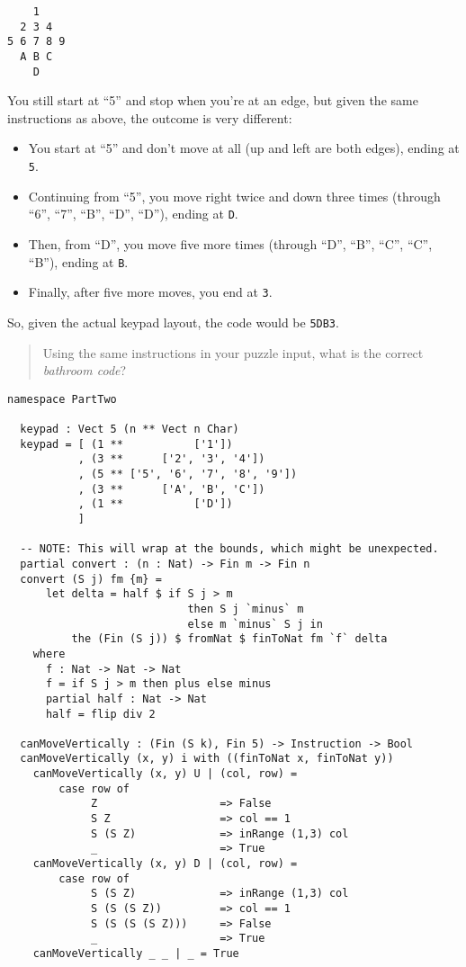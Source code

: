 \documentclass[b5paper,twoside]{amsbook}
\providecommand{\tightlist}{%
  \setlength{\itemsep}{0pt}\setlength{\parskip}{0pt}}
\begin{document}
\begin{verbatim}
    1
  2 3 4
5 6 7 8 9
  A B C
    D
\end{verbatim}

You still start at ``5'' and stop when you're at an edge, but given the
same instructions as above, the outcome is very different:

\begin{itemize}
\tightlist
\item
  You start at ``5'' and don't move at all (up and left are both edges),
  ending at \texttt{5}.
\item
  Continuing from ``5'', you move right twice and down three times
  (through ``6'', ``7'', ``B'', ``D'', ``D''), ending at
  \texttt{D}.
\item
  Then, from ``D'', you move five more times (through ``D'', ``B'',
  ``C'', ``C'', ``B''), ending at \texttt{B}.
\item
  Finally, after five more moves, you end at \texttt{3}.
\end{itemize}

\newpage

So, given the actual keypad layout, the code would be
\texttt{5DB3}.

\begin{quote}
  Using the same instructions in your puzzle input, what is the correct
  \textit{bathroom code}?
\end{quote}

\begin{verbatim}
namespace PartTwo

  keypad : Vect 5 (n ** Vect n Char)
  keypad = [ (1 **           ['1'])
           , (3 **      ['2', '3', '4'])
           , (5 ** ['5', '6', '7', '8', '9'])
           , (3 **      ['A', 'B', 'C'])
           , (1 **           ['D'])
           ]

  -- NOTE: This will wrap at the bounds, which might be unexpected.
  partial convert : (n : Nat) -> Fin m -> Fin n
  convert (S j) fm {m} =
      let delta = half $ if S j > m
                            then S j `minus` m
                            else m `minus` S j in
          the (Fin (S j)) $ fromNat $ finToNat fm `f` delta
    where
      f : Nat -> Nat -> Nat
      f = if S j > m then plus else minus
      partial half : Nat -> Nat
      half = flip div 2

  canMoveVertically : (Fin (S k), Fin 5) -> Instruction -> Bool
  canMoveVertically (x, y) i with ((finToNat x, finToNat y))
    canMoveVertically (x, y) U | (col, row) =
        case row of
             Z                   => False
             S Z                 => col == 1
             S (S Z)             => inRange (1,3) col
             _                   => True
    canMoveVertically (x, y) D | (col, row) =
        case row of
             S (S Z)             => inRange (1,3) col
             S (S (S Z))         => col == 1
             S (S (S (S Z)))     => False
             _                   => True
    canMoveVertically _ _ | _ = True
\end{verbatim}
\end{document}
